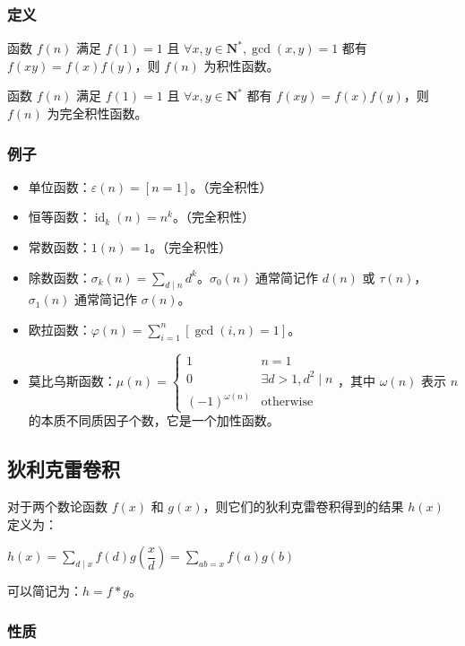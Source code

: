 \documentclass[UTF8, twoside]{ctexart}
\begin{document}
\begin{sloppypar}
\subsubsection{定义}

函数 $f(n)$ 满足 $f(1)=1$ 且 $\forall x,y\in\mathbf{N}^*,\gcd(x,y)=1$ 都有 $f(xy)=f(x)f(y)$，则 $f(n)$ 为积性函数。

函数 $f(n)$ 满足 $f(1)=1$ 且 $\forall x,y\in\mathbf{N}^*$ 都有 $f(xy)=f(x)f(y)$，则 $f(n)$ 为完全积性函数。

\subsubsection{例子}

\begin{itemize}
   \item 单位函数：$\varepsilon(n)=[n=1]$。（完全积性）
   \item 恒等函数：$\operatorname{id}_k(n)=n^k$。（完全积性）
   \item 常数函数：$1(n)=1$。（完全积性）
   \item 除数函数：$\sigma_{k}(n)=\sum_{d\mid n}d^{k}$。$\sigma_{0}(n)$ 通常简记作 $d(n)$ 或 $\tau(n)$，$\sigma_{1}(n)$ 通常简记作 $\sigma(n)$。
   \item 欧拉函数：$\varphi(n)=\sum_{i=1}^n[\gcd(i,n)=1]$。
   \item 莫比乌斯函数：$\mu(n)=\begin{cases}1&n=1\\0&\exists d>1,d^{2}\mid n\\(-1)^{\omega(n)}&\text{otherwise}\end{cases}$，其中 $\omega(n)$ 表示 $n$ 的本质不同质因子个数，它是一个加性函数。
\end{itemize}

\subsection{狄利克雷卷积}

对于两个数论函数 $f(x)$ 和 $g(x)$，则它们的狄利克雷卷积得到的结果 $h(x)$ 定义为：

$h(x)=\sum_{d\mid x}{f(d)g\left(\dfrac xd \right)}=\sum_{ab=x}{f(a)g(b)}$

可以简记为：$h=f*g$。

\subsubsection{性质}


\end{sloppypar}
\end{document}
